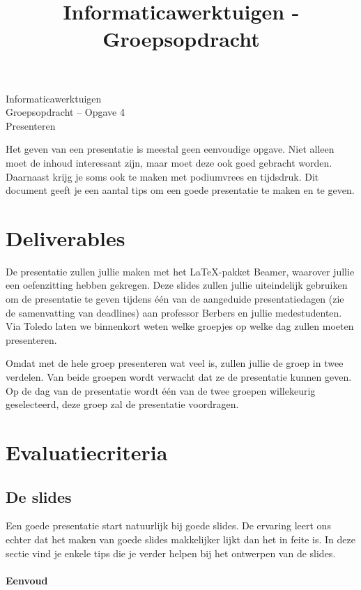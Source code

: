\documentclass[a4paper]{article}
\title{Informaticawerktuigen - Groepsopdracht}
\begin{document}
\begin{center}
  \huge Informaticawerktuigen \\
  \Huge Groepsopdracht -- Opgave 4 \\
  \huge Presenteren
\end{center}
\vspace{1em}

Het geven van een presentatie is meestal geen eenvoudige opgave.
Niet alleen moet de inhoud interessant zijn, maar moet deze ook goed gebracht worden.
Daarnaast krijg je soms ook te maken met podiumvrees en tijdsdruk.
Dit document geeft je een aantal tips om een goede presentatie te maken en te geven.


\section{Deliverables}

De presentatie zullen jullie maken met het \LaTeX{}-pakket Beamer, waarover jullie een oefenzitting hebben gekregen.
Deze slides zullen jullie uiteindelijk gebruiken om de presentatie te geven tijdens \'e\'en van de aangeduide presentatiedagen (zie de samenvatting van deadlines) aan professor Berbers en jullie medestudenten.
Via Toledo laten we binnenkort weten welke groepjes op welke dag zullen moeten presenteren.

Omdat met de hele groep presenteren wat veel is, zullen jullie de groep in twee verdelen.
Van beide groepen wordt verwacht dat ze de presentatie kunnen geven.
Op de dag van de presentatie wordt \'e\'en van de twee groepen willekeurig geselecteerd, deze groep zal de presentatie voordragen.


\section{Evaluatiecriteria}

\subsection{De slides}

Een goede presentatie start natuurlijk bij goede slides.
De ervaring leert ons echter dat het maken van goede slides makkelijker lijkt dan het in feite is.
In deze sectie vind je enkele tips die je verder helpen bij het ontwerpen van de slides.


\paragraph{Eenvoud}
\end{document}
